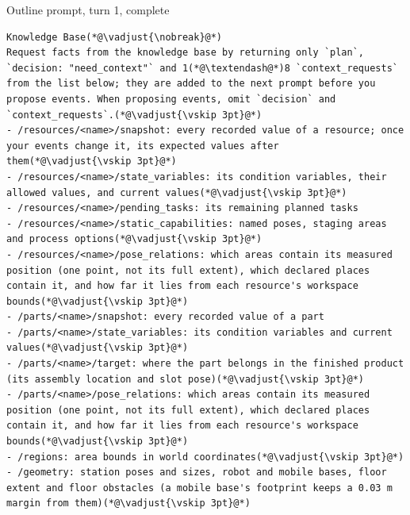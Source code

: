 \documentclass[preprint,12pt,authoryear]{elsarticle}
\begin{document}
\begin{fullbox}{Outline prompt, turn 1, complete}
\begin{lstlisting}[showlines=true]
Knowledge Base(*@\vadjust{\nobreak}@*)
Request facts from the knowledge base by returning only `plan`, `decision: "need_context"` and 1(*@\textendash@*)8 `context_requests` from the list below; they are added to the next prompt before you propose events. When proposing events, omit `decision` and `context_requests`.(*@\vadjust{\vskip 3pt}@*)
- /resources/<name>/snapshot: every recorded value of a resource; once your events change it, its expected values after them(*@\vadjust{\vskip 3pt}@*)
- /resources/<name>/state_variables: its condition variables, their allowed values, and current values(*@\vadjust{\vskip 3pt}@*)
- /resources/<name>/pending_tasks: its remaining planned tasks
- /resources/<name>/static_capabilities: named poses, staging areas and process options(*@\vadjust{\vskip 3pt}@*)
- /resources/<name>/pose_relations: which areas contain its measured position (one point, not its full extent), which declared places contain it, and how far it lies from each resource's workspace bounds(*@\vadjust{\vskip 3pt}@*)
- /parts/<name>/snapshot: every recorded value of a part
- /parts/<name>/state_variables: its condition variables and current values(*@\vadjust{\vskip 3pt}@*)
- /parts/<name>/target: where the part belongs in the finished product (its assembly location and slot pose)(*@\vadjust{\vskip 3pt}@*)
- /parts/<name>/pose_relations: which areas contain its measured position (one point, not its full extent), which declared places contain it, and how far it lies from each resource's workspace bounds(*@\vadjust{\vskip 3pt}@*)
- /regions: area bounds in world coordinates(*@\vadjust{\vskip 3pt}@*)
- /geometry: station poses and sizes, robot and mobile bases, floor extent and floor obstacles (a mobile base's footprint keeps a 0.03 m margin from them)(*@\vadjust{\vskip 3pt}@*)


\end{lstlisting}
\end{fullbox}
\end{document}
